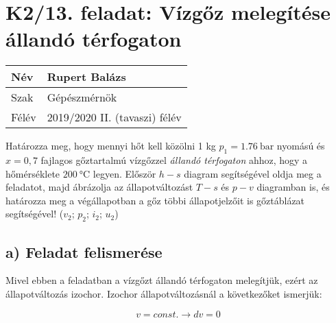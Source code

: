 \newcommand\pegy{0.176} %
\newcommand\TegyK{389.34} %
\newcommand\TegyC{116.19} %
\newcommand\vegy{0.699}
\newcommand\uegy{1913.2}
\newcommand\hegy{2036.3}
\newcommand\segy{5.4645}
\newcommand\xegy{0.7}
\newcommand\pvesszo{0.2575}
\newcommand\TvesszoK{401.52}
\newcommand\TvesszoC{128.37}
\newcommand\vvesszo{0.699}
\newcommand\uvesszo{2537.3}
\newcommand\hvesszo{2717.3}
\newcommand\svesszo{7.0419}
\newcommand\xvesszo{1}
\newcommand\pketto{0.3073}
\newcommand\TkettoK{473.15}
\newcommand\TkettoC{200}
\newcommand\vketto{0.699}
\newcommand\uketto{2649.5}
\newcommand\hketto{2864.3}
\newcommand\sketto{7.2992}

\newcommand\pontvastagsag{0.7 mm} %

\section*{K2/13. feladat: Vízgőz melegítése állandó térfogaton}
\begin{tabular}{ | p{2cm} | p{14cm} | } 
	\hline
	Név & Rupert Balázs \\ 
	\hline
	Szak & Gépészmérnök\\ 
	\hline
	Félév & 2019/2020 II. (tavaszi) félév \\ 
	\hline
\end{tabular}
\vspace{0.5cm}

	Határozza meg, hogy mennyi hőt kell közölni 1 kg $p_1=\SI{1,76}{\bar}$ nyomású és $x = 0,7$ fajlagos gőztartalmú vízgőzzel \textit{állandó térfogaton} ahhoz, hogy a hőmérséklete $\SI{200}{\celsius}$ legyen. Először $h-s$ diagram segítségével oldja meg a feladatot, majd ábrázolja az állapotváltozást $T-s$ és $p-v$ diagramban is, és határozza meg a végállapotban a gőz többi állapotjelzőit is gőztáblázat segítségével! ($v_2$; $p_2$; $i_2$; $u_2$)
	\vspace{2mm}

\subsection*{a) Feladat felismerése}
	Mivel ebben a feladatban a vízgőzt állandó térfogaton melegítjük, ezért az állapotváltozás izochor.
	Izochor állapotváltozásnál a következőket ismerjük:
	
\begin{equation}
	v=const. \rightarrow dv=0
\end{equation}

